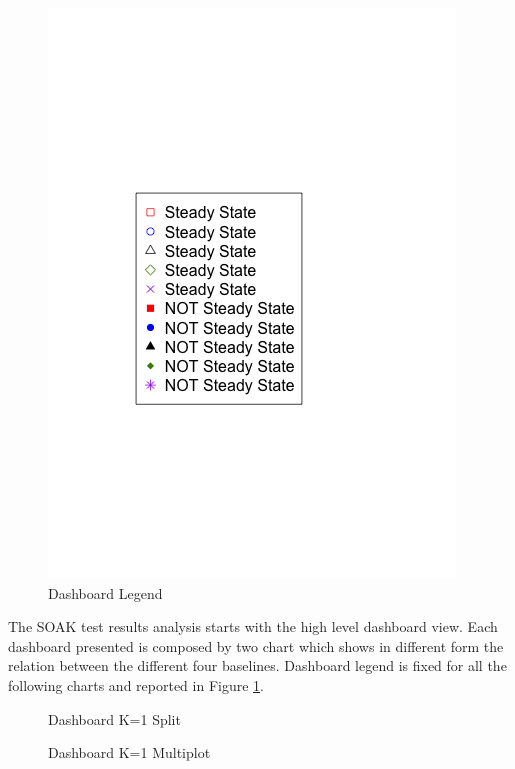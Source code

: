 \begin{figure}[tbh]
	\centering
	\includegraphics[width=\linewidth]{images/dashboard-legend}	
	\caption{Dashboard Legend} 
	\label{fig:dashboard-legend}
\end{figure}

The SOAK test results analysis starts with the high level dashboard view. Each dashboard presented is composed by two chart which shows in different form the relation between the different four baselines. Dashboard legend is fixed for all the following charts and reported in Figure \ref{fig:dashboard-legend}.

\begin{figure}[tbh]
	\centering
	\caption{Dashboard K=1 Split} 
	\label{fig:result_dashboard_ka}
\end{figure}

\begin{figure}[tbh]
	\centering
	\caption{Dashboard K=1 Multiplot} 
	\label{fig:result_dashboard_kb}
\end{figure}

